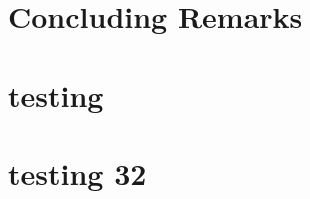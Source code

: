 \documentclass[12pt]{report}
\begin{document}
% 

% 

% 

\chapter{Concluding Remarks}


\printbibliography

\appendix
\chapter{testing}

\chapter{testing 32}
\end{document}
